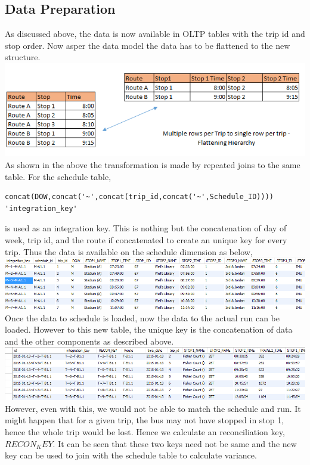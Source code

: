 \documentclass[12pt]{article}
\begin{document}
\subsection{Data Preparation}
As discussed above, the data is now available in OLTP tables with the trip id and stop order. Now asper the data model the data has to be flattened to the new structure.\\
\includegraphics[scale=0.6]{resources/hierarchy}\\[1cm] 
As shown in the above the transformation is made by repeated joins to the same table. For the schedule table,
\begin{verbatim}
concat(DOW,concat('~',concat(trip_id,concat('~',Schedule_ID)))) 'integration_key' 
\end{verbatim}
is used as an integration key. This is nothing but the concatenation of day of week, trip id, and the route if concatenated to create an unique key for every trip. Thus the data is available on the schedule dimension as below,\\
\includegraphics[scale=0.6]{resources/wt1}\\[1cm] 
Once the data to schedule is loaded, now the data to the actual run can be loaded. However to this new table, the unique key is the concatenation of data and the other components as described above. \\
\includegraphics[scale=0.6]{resources/wh2}\\[1cm] 
However, even with this, we would not be able to match the schedule and run. It might happen that for a given trip, the bus may not have stopped in stop 1, hence the whole trip would be lost. Hence we calculate an reconciliation key, $RECON_KEY$. It can be seen that these two keys need not be same and the new key can be used to join with the schedule table to calculate variance. \\
\end{document}
